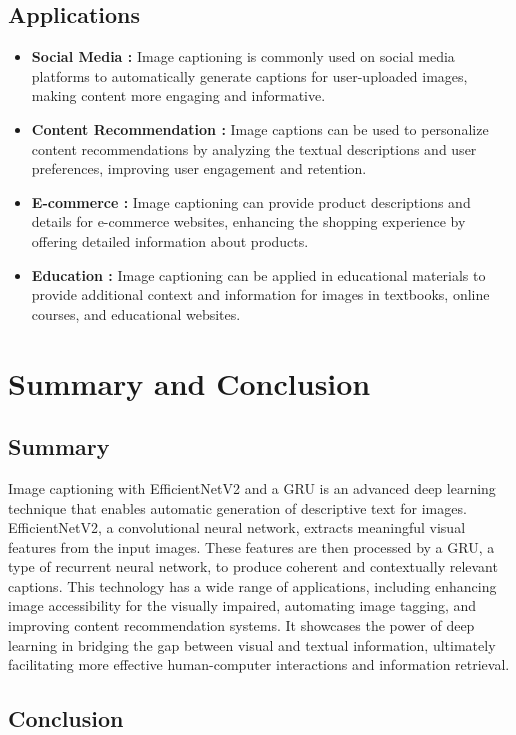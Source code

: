 \documentclass[oneside,a4paper,12pt]{report}
\begin{document}
\section{Applications}
\begin{itemize}
\item \textbf{Social Media : }Image captioning is commonly used on social media platforms to automatically generate captions for user-uploaded images, making content more engaging and informative.
 \item \textbf{Content Recommendation : }Image captions can be used to personalize content recommendations by analyzing the textual descriptions and user preferences, improving user engagement and retention.
 \item \textbf{E-commerce : }Image captioning can provide product descriptions and details for e-commerce websites, enhancing the shopping experience by offering detailed information about products.
 \item \textbf{Education : }Image captioning can be applied in educational materials to provide additional context and information for images in textbooks, online courses, and educational websites.
\end{itemize}

\chapter{Summary and Conclusion}
\section{Summary}
Image captioning with EfficientNetV2 and a GRU is an advanced deep learning technique that enables automatic generation of descriptive text for images. EfficientNetV2, a convolutional neural network, extracts meaningful visual features from the input images. These features are then processed by a GRU, a type of recurrent neural network, to produce coherent and contextually relevant captions. This technology has a wide range of applications, including enhancing image accessibility for the visually impaired, automating image tagging, and improving content recommendation systems. It showcases the power of deep learning in bridging the gap between visual and textual information, ultimately facilitating more effective human-computer interactions and information retrieval.
\section{Conclusion}
\end{document}

